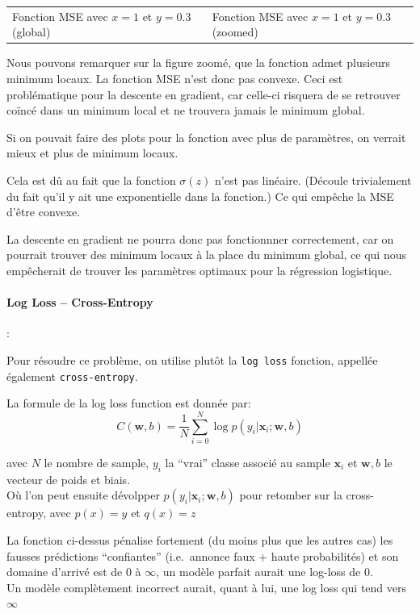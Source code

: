 \documentclass[
]{article}
\begin{document}
\begin{longtable}[]{@{}
  >{\centering\arraybackslash}p{}
  >{\centering\arraybackslash}p{}@{}}
Fonction MSE avec \(x = 1\) et \(y = 0.3\) (global) & Fonction MSE avec
\(x = 1\) et \(y = 0.3\) (zoomed) \\
\end{longtable}

Nous pouvons remarquer sur la figure zoomé, que la fonction admet
plusieurs minimum locaux. La fonction MSE n'est donc pas convexe. Ceci
est problématique pour la descente en gradient, car celle-ci risquera de
se retrouver coïncé dans un minimum local et ne trouvera jamais le
minimum global.

Si on pouvait faire des plots pour la fonction avec plus de paramètres,
on verrait mieux et plus de minimum locaux.

Cela est dû au fait que la fonction \(\sigma(z)\) n'est pas linéaire.
(Découle trivialement du fait qu'il y ait une exponentielle dans la
fonction.) Ce qui empêche la MSE d'être convexe.

La descente en gradient ne pourra donc pas fonctionnner correctement,
car on pourrait trouver des minimum locaux à la place du minimum global,
ce qui nous empêcherait de trouver les paramètres optimaux pour la
régression logistique.

\hypertarget{log-loss-cross-entropy}{%
\paragraph{Log Loss -- Cross-Entropy}\label{log-loss-cross-entropy}}

:

Pour résoudre ce problème, on utilise plutôt la \texttt{log\ loss}
fonction, appellée également \texttt{cross-entropy}.

La formule de la log loss function est donnée par: \[
C(\mathbf{w},b) = \frac{1}{N} \sum_{i=0}^{N}{ \log p(y_i | \mathbf{x}_i; \mathbf{w}, b) }
\]

avec \(N\) le nombre de sample, \(y_i\) la ``vrai'' classe associé au
sample \(\mathbf{x}_i\) et \(\mathbf{w}, b\) le vecteur de poids et
biais.\\
Où l'on peut ensuite dévolpper \(p(y_i | \mathbf{x}_i; \mathbf{w}, b)\)
pour retomber sur la cross-entropy, avec \(p(x) = y\) et \(q(x) = z\)

La fonction ci-dessus pénalise fortement (du moins plus que les autres
cas) les fausses prédictions ``confiantes'' (i.e.~annonce faux + haute
probabilités) et son domaine d'arrivé est de 0 à \(\infty\), un modèle
parfait aurait une log-loss de 0.\\
Un modèle complètement incorrect aurait, quant à lui, une log loss qui
tend vers \(\infty\)
\end{document}
